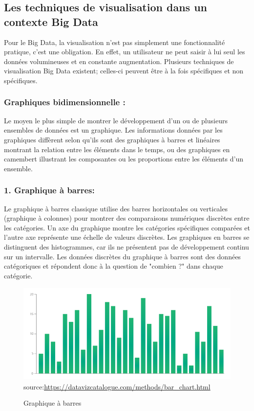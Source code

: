 \documentclass[french, a4paper, 12pt]{report}
\begin{document}
\subsection{Les techniques de visualisation dans un contexte Big Data }
Pour le Big Data, la visualisation n’est pas simplement une fonctionnalité pratique, c’est une obligation. En effet, un utilisateur ne peut saisir à lui seul les données volumineuses et en constante augmentation. Plusieurs techniques de visualisation Big Data existent; celles-ci peuvent être à la fois spécifiques et non spécifiques.
\subsubsection{Graphiques bidimensionnelle :}
Le moyen le plus simple de montrer le développement d'un ou de plusieurs ensembles de données est un graphique. Les informations données par les graphiques diffèrent selon qu’ils sont des graphiques à barres et linéaires montrant la relation entre les éléments dans le temps, ou des graphiques en camembert illustrant les composantes ou les proportions entre les éléments d'un ensemble.
\subsubsection{1. Graphique à barres:}
Le graphique à barres classique utilise des barres horizontales ou verticales (graphique à colonnes) pour montrer des comparaisons numériques discrètes entre les catégories. Un axe du graphique montre les catégories spécifiques comparées et l'autre axe représente une échelle de valeurs discrètes.
Les graphiques en barres se distinguent des histogrammes, car ils ne présentent pas de développement continu sur un intervalle. Les données discrètes du graphique à barres sont des données catégoriques et répondent donc à la question de "combien ?" dans chaque catégorie.

\begin{figure}[!ht]
    \centering
    \includegraphics[height=5cm]{images/bar_chart.png}
    \scriptsize{source:\url{https://datavizcatalogue.com/methods/bar_chart.html}}
    \caption{Graphique à barres}
    \label{fig:2.3}
\end{figure}
\end{document}
